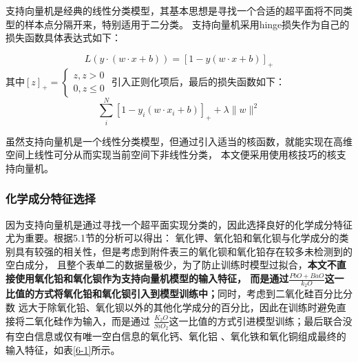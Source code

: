 \documentclass[withoutpreface,bwprint]{cumcmthesis} %
\begin{document}
支持向量机是经典的线性分类模型，其基本思想是寻找一个合适的超平面将不同类型的样本点分隔开来，特别适用于二分类。 支持向量机采用hinge损失作为自己的损失函数具体表达式如下：

$$L(y \cdot(w \cdot x+b))=[1-y(w \cdot x+b)]_{+}$$ 其中$[z]_{+}=\left\{\begin{array}{l} z, z>0 \\ 0, z \leq 0 \end{array}\right.$
引入正则化项后，最后的损失函数如下： $$\sum_{i}^{N}\left[1-y_{i}\left(w \cdot x_{i}+b\right)\right]_{+}+\lambda\|w\|^{2}$$

虽然支持向量机是一个线性分类模型，但通过引入适当的核函数，就能实现在高维空间上线性可分从而实现当前空间下非线性分类， 本文便采用使用核技巧的核支持向量机。

\subsubsection{化学成分特征选择}

因为支持向量机是通过寻找一个超平面实现分类的，因此选择良好的化学成分特征尤为重要。根据5.1节的分析可以得出： 氧化钾、氧化铅和氧化钡与化学成分的类别具有较强的相关性，但是考虑到附件表三的氧化钡和氧化铅存在较多未检测到的空白成分， 且整个表单二的数据量极少，为了防止训练时模型过拟合，\textbf{本文不直接使用氧化铅和氧化钡作为支持向量机模型的输入特征， 而是通过$\frac{PbO+BaO}{k_{2} O}$这一比值的方式将氧化铅和氧化钡引入到模型训练中；}同时，考虑到二氧化硅百分比分数 远大于除氧化铅、氧化钡以外的其他化学成分的百分比，因此在训练时避免直接将二氧化硅作为输入，而是通过 $\frac{K_{2}O}{SiO_{2}}$这一比值的方式引进模型训练；最后联合没有空白信息或仅有唯一空白信息的氧化钙、氧化铝 、氧化铁和氧化铜组成最终的输入特征，如表\ref{6-1}所示。
\end{document}
